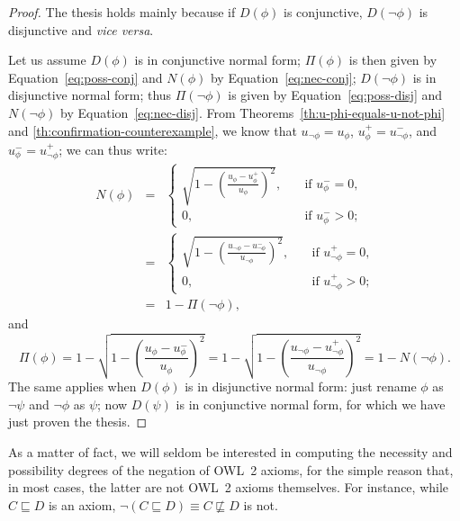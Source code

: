 \documentclass[review]{elsarticle}
\theoremstyle{definition}
\begin{document}
\begin{proof}
The thesis holds mainly because if $D(\phi)$ is conjunctive,
$D(\neg\phi)$ is disjunctive and \emph{vice versa}.

Let us assume $D(\phi)$ is in conjunctive normal form; $\Pi(\phi)$ is then
given by Equation~\ref{eq:poss-conj} and $N(\phi)$ by Equation~\ref{eq:nec-conj};
$D(\neg\phi)$ is in disjunctive normal form; thus $\Pi(\neg\phi)$ is given
by Equation~\ref{eq:poss-disj} and $N(\neg\phi)$ by Equation~\ref{eq:nec-disj}.
From Theorems~\ref{th:u-phi-equals-u-not-phi} and \ref{th:confirmation-counterexample},
we know that $u_{\neg\phi} = u_\phi$, $u_\phi^+ = u_{\neg\phi}^-$,
and $u_\phi^- = u_{\neg\phi}^+$; we can thus write:
\begin{eqnarray*}
  N(\phi) &=& \left\{\begin{array}{ll}
    \sqrt{1 - \left(\frac{u_\phi - u_\phi^+}{u_\phi}\right)^2},\quad & \mbox{if $u_\phi^- = 0$,}\\[1.5em]
    0, & \mbox{if $u_\phi^- > 0$;}
  \end{array}\right. \\
  &=& \left\{\begin{array}{ll}
    \sqrt{1 - \left(\frac{u_{\neg\phi} - u_{\neg\phi}^-}{u_{\neg\phi}}\right)^2},\quad & \mbox{if $u_{\neg\phi}^+ = 0$,}\\[1.5em]
    0, & \mbox{if $u_{\neg\phi}^+ > 0$;}
  \end{array}\right. \\
  &=& 1 - \Pi(\neg\phi),
\end{eqnarray*}
and
\[
  \Pi(\phi) = 1 - \sqrt{1 - \left(\frac{u_\phi - u_\phi^-}{u_\phi}\right)^2}
            = 1 - \sqrt{1 - \left(\frac{u_{\neg\phi} - u_{\neg\phi}^+}{u_{\neg\phi}}\right)^2}
            = 1 - N(\neg\phi).
\]
The same applies when $D(\phi)$ is in disjunctive normal form: just rename
$\phi$ as $\neg\psi$ and $\neg\phi$ as $\psi$; now $D(\psi)$ is in conjunctive
normal form, for which we have just proven the thesis.
\end{proof}

As a matter of fact, we will seldom be interested in computing the necessity and
possibility degrees of the negation of OWL~2 axioms, for the simple reason that, in most cases,
the latter are not OWL~2 axioms themselves. For instance, while $C \sqsubseteq D$
is an axiom, $\neg(C \sqsubseteq D) \equiv C \not\sqsubseteq D$ is not.
\end{document}
